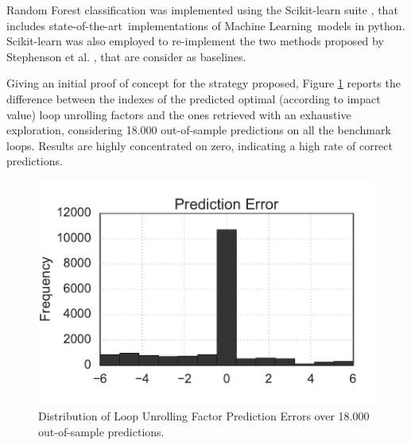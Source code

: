 \documentclass[]{usiinfthesis}
\newcommand{\SoTA}{{state-of-the-art}}
\newcommand{\ML}{{Machine Learning}}
\begin{document}
Random Forest classification was implemented using the Scikit-learn suite \cite{PedregosaOct11}, 
that includes \SoTA\ implementations of \ML\ models in python. Scikit-learn was also employed to 
re-implement the two methods proposed by Stephenson et al. \cite{StephensonApr05}, that are consider 
as baselines.\par

Giving an initial proof of concept for the strategy proposed, Figure \ref{fig:dist} reports the 
difference between the indexes of the predicted optimal (according to impact value) loop unrolling 
factors and the ones retrieved with an exhaustive exploration, considering 18.000 out-of-sample 
predictions on all the benchmark loops. Results are highly concentrated on zero, 
indicating a high rate of correct predictions.\par

\begin{figure}[h]
\centering
\includegraphics[width=.5\linewidth]{figs/prediction_errors}
\vspace{-1em}
\caption{Distribution of Loop Unrolling Factor Prediction Errors over 18.000 
out-of-sample predictions.}
\label{fig:dist}

\end{figure}

\end{document}
